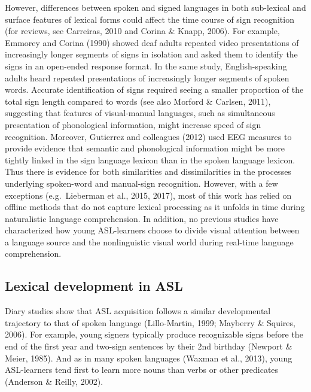 \documentclass[oneside]{report}
\begin{document}
However, differences between spoken and signed languages in both
sub-lexical and surface features of lexical forms could affect the time
course of sign recognition (for reviews, see Carreiras, 2010 and Corina
\& Knapp, 2006). For example, Emmorey and Corina (1990) showed deaf
adults repeated video presentations of increasingly longer segments of
signs in isolation and asked them to identify the signs in an open-ended
response format. In the same study, English-speaking adults heard
repeated presentations of increasingly longer segments of spoken words.
Accurate identification of signs required seeing a smaller proportion of
the total sign length compared to words (see also Morford \& Carlsen,
2011), suggesting that features of visual-manual languages, such as
simultaneous presentation of phonological information, might increase
speed of sign recognition. Moreover, Gutierrez and colleagues (2012)
used EEG measures to provide evidence that semantic and phonological
information might be more tightly linked in the sign language lexicon
than in the spoken language lexicon. Thus there is evidence for both
similarities and dissimilarities in the processes underlying spoken-word
and manual-sign recognition. However, with a few exceptions
(e.g.~Lieberman et al., 2015, 2017), most of this work has relied on
offline methods that do not capture lexical processing as it unfolds in
time during naturalistic language comprehension. In addition, no
previous studies have characterized how young ASL-learners choose to
divide visual attention between a language source and the nonlinguistic
visual world during real-time language comprehension.

\subsection{Lexical development in
ASL}\label{lexical-development-in-asl}

Diary studies show that ASL acquisition follows a similar developmental
trajectory to that of spoken language (Lillo-Martin, 1999; Mayberry \&
Squires, 2006). For example, young signers typically produce
recognizable signs before the end of the first year and two-sign
sentences by their 2nd birthday (Newport \& Meier, 1985). And as in many
spoken languages (Waxman et al., 2013), young ASL-learners tend first to
learn more nouns than verbs or other predicates (Anderson \& Reilly,
2002).
\end{document}
